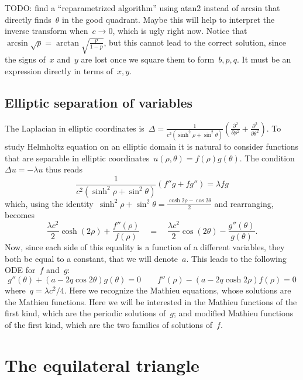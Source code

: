 TODO: find a ``reparametrized algorithm'' using atan2 instead of
arcsin that directly finds~$\theta$ in the good quadrant.  Maybe this
will help to interpret the inverse transform when~$c\to0$, which is
ugly right now.  Notice that~$\arcsin\sqrt
p=\arctan\sqrt{\frac{p}{1-p}}$, but this cannot lead to the correct
solution, since the signs of~$x$ and~$y$ are lost once we square
them to form~$b,p,q$.  It must be an expression directly in terms
of~$x,y$.

\subsection{Elliptic separation of variables}

The Laplacian in elliptic coordinates
is~$\displaystyle\Delta=
\frac1{c^2\left(\sinh^2\rho+\sin^2\theta\right)}
\left(
	\frac{\partial^2}{\partial\rho^2}
	+
	\frac{\partial^2}{\partial\theta^2}
\right)
$.
To study Helmholtz equation on an elliptic domain it is natural to
consider functions that are separable in elliptic
coordinates~$u(\rho,\theta)=f(\rho)g(\theta)$.  The condition~$\Delta
u=-\lambda u$ thus reads
\[
\frac1{c^2\left(\sinh^2\rho+\sin^2\theta\right)}
\left(f''g+fg''\right)
=\lambda fg
\]
which, using the
identity~$\sinh^2\rho+\sin^2\theta=\frac{\cosh{2\rho}-\cos{2\theta}}2$
and
rearranging, becomes
\[
	\frac{\lambda c^2}2\cosh(2\rho)
	+
	\frac{f''(\rho)}{f(\rho)}
	\quad = \quad
	\frac{\lambda c^2}2\cos(2\theta)
	-\frac{g''(\theta)}{g(\theta)}.
\]
Now,
since each side of this equality is a function of a different
variables, they both be equal to a constant, that we will denote~$a$.
This leads to the following ODE for~$f$ and~$g$:
\begin{equation}\label{eq:mathieuell}
	g''(\theta)+\left(a-2q\cos2\theta\right)g(\theta)=0
	\qquad
	f''(\rho)-\left(a-2q\cosh2\rho\right)f(\rho)=0
\end{equation}
where~$q=\lambda c^2/4$.  Here we recognize the Mathieu
equations, whose solutions are the Mathieu functions.  Here we will
be interested in the Mathieu functions of the first kind, which are
the periodic solutions of~$g$; and modified Mathieu functions of the
first kind, which are the two families of solutions of~$f$.



\section{The equilateral triangle}

